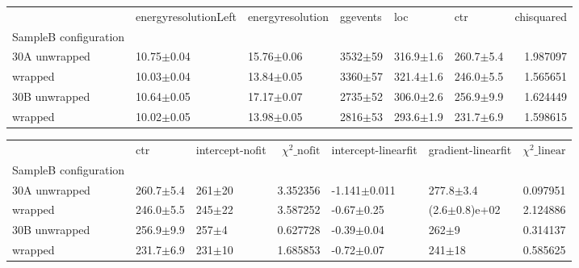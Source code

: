 \begin{tabular}{llllllr}
\hline
{} & energyresolutionLeft & energyresolution &     ggevents &            loc &            ctr &  chisquared \\
SampleB configuration &                      &                  &              &                &                &             \\
\hline
30A     unwrapped     &       10.75$\pm$0.04 &   15.76$\pm$0.06 &  3532$\pm$59 &  316.9$\pm$1.6 &  260.7$\pm$5.4 &    1.987097 \\
        wrapped       &       10.03$\pm$0.04 &   13.84$\pm$0.05 &  3360$\pm$57 &  321.4$\pm$1.6 &  246.0$\pm$5.5 &    1.565651 \\
30B     unwrapped     &       10.64$\pm$0.05 &   17.17$\pm$0.07 &  2735$\pm$52 &  306.0$\pm$2.6 &  256.9$\pm$9.9 &    1.624449 \\
        wrapped       &       10.02$\pm$0.05 &   13.98$\pm$0.05 &  2816$\pm$53 &  293.6$\pm$1.9 &  231.7$\pm$6.9 &    1.598615 \\
\hline
\end{tabular}

\begin{tabular}{lllrllr}
\hline
{} &            ctr & intercept-nofit &  $\chi^2\_\text{nofit}$ & intercept-linearfit & gradient-linearfit &  $\chi^2\_\text{linear}$ \\
SampleB configuration &                &                 &                        &                     &                    &                         \\
\hline
30A     unwrapped     &  260.7$\pm$5.4 &      261$\pm$20 &               3.352356 &    -1.141$\pm$0.011 &      277.8$\pm$3.4 &                0.097951 \\
        wrapped       &  246.0$\pm$5.5 &      245$\pm$22 &               3.587252 &      -0.67$\pm$0.25 &  (2.6$\pm$0.8)e+02 &                2.124886 \\
30B     unwrapped     &  256.9$\pm$9.9 &       257$\pm$4 &               0.627728 &      -0.39$\pm$0.04 &          262$\pm$9 &                0.314137 \\
        wrapped       &  231.7$\pm$6.9 &      231$\pm$10 &               1.685853 &      -0.72$\pm$0.07 &         241$\pm$18 &                0.585625 \\
\hline
\end{tabular}

